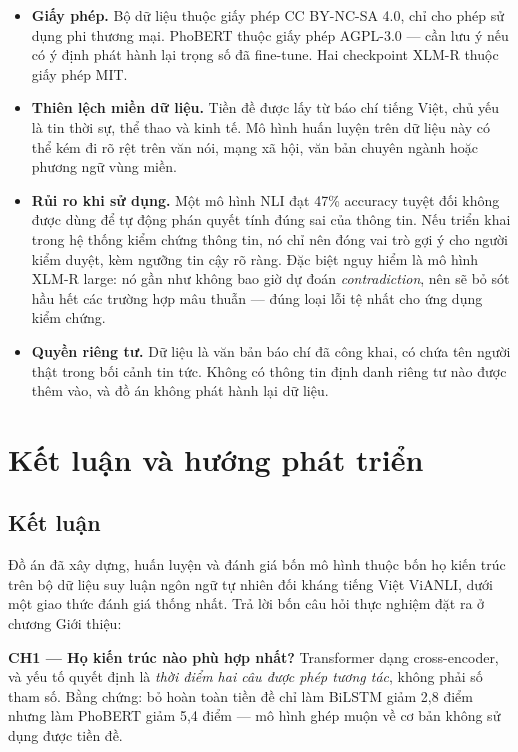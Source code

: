 \documentclass[12pt,a4paper,oneside]{report}
\begin{document}
\begin{itemize}[leftmargin=*,itemsep=3pt]
  \item \textbf{Giấy phép.} Bộ dữ liệu thuộc giấy phép CC BY-NC-SA 4.0, chỉ cho phép sử
        dụng phi thương mại. PhoBERT thuộc giấy phép AGPL-3.0 --- cần lưu ý nếu có ý định
        phát hành lại trọng số đã fine-tune. Hai checkpoint XLM-R thuộc giấy phép MIT.
  \item \textbf{Thiên lệch miền dữ liệu.} Tiền đề được lấy từ báo chí tiếng Việt, chủ yếu
        là tin thời sự, thể thao và kinh tế. Mô hình huấn luyện trên dữ liệu này có thể
        kém đi rõ rệt trên văn nói, mạng xã hội, văn bản chuyên ngành hoặc phương ngữ
        vùng miền.
  \item \textbf{Rủi ro khi sử dụng.} Một mô hình NLI đạt 47\% accuracy tuyệt đối không
        được dùng để tự động phán quyết tính đúng sai của thông tin. Nếu triển khai trong
        hệ thống kiểm chứng thông tin, nó chỉ nên đóng vai trò gợi ý cho người kiểm duyệt,
        kèm ngưỡng tin cậy rõ ràng. Đặc biệt nguy hiểm là mô hình XLM-R large: nó gần như
        không bao giờ dự đoán \textit{contradiction}, nên sẽ bỏ sót hầu hết các trường hợp
        mâu thuẫn --- đúng loại lỗi tệ nhất cho ứng dụng kiểm chứng.
  \item \textbf{Quyền riêng tư.} Dữ liệu là văn bản báo chí đã công khai, có chứa tên
        người thật trong bối cảnh tin tức. Không có thông tin định danh riêng tư nào được
        thêm vào, và đồ án không phát hành lại dữ liệu.
\end{itemize}

\chapter{Kết luận và hướng phát triển}

\section{Kết luận}

Đồ án đã xây dựng, huấn luyện và đánh giá bốn mô hình thuộc bốn họ kiến trúc trên bộ dữ
liệu suy luận ngôn ngữ tự nhiên đối kháng tiếng Việt ViANLI, dưới một giao thức đánh giá
thống nhất. Trả lời bốn câu hỏi thực nghiệm đặt ra ở chương Giới thiệu:

\textbf{CH1 --- Họ kiến trúc nào phù hợp nhất?} Transformer dạng cross-encoder, và yếu tố
quyết định là \textit{thời điểm hai câu được phép tương tác}, không phải số tham số. Bằng
chứng: bỏ hoàn toàn tiền đề chỉ làm BiLSTM giảm 2,8 điểm nhưng làm PhoBERT giảm 5,4 điểm
--- mô hình ghép muộn về cơ bản không sử dụng được tiền đề.
\end{document}

